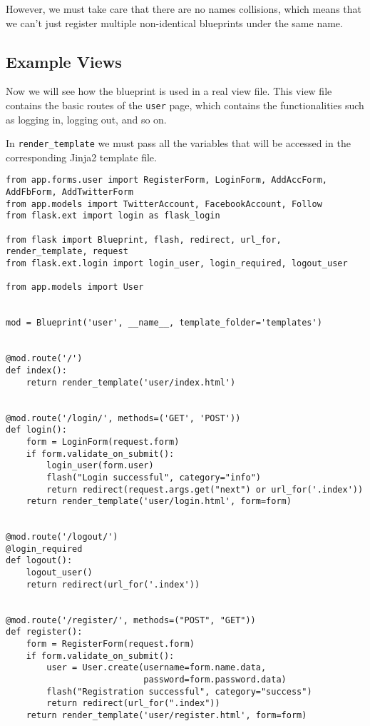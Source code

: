 \documentclass[../main/main.tex]{subfiles}
\begin{document}
However, we must take care that there are no names collisions, which
means that we can't just register multiple non-identical blueprints
under the same name. 

\subsection{Example Views}

Now we will see how the blueprint is used in a real view file. This view file
contains the basic routes of the \lstinline|user| page, which contains the
functionalities such as logging in, logging out, and so on.

In \lstinline|render_template| we must pass all the variables that will be
accessed in the corresponding Jinja2 template file. 

\begin{lstlisting}[caption=app/views/user.py, label=lst:data.py]
from app.forms.user import RegisterForm, LoginForm, AddAccForm, AddFbForm, AddTwitterForm
from app.models import TwitterAccount, FacebookAccount, Follow
from flask.ext import login as flask_login

from flask import Blueprint, flash, redirect, url_for, render_template, request
from flask.ext.login import login_user, login_required, logout_user

from app.models import User


mod = Blueprint('user', __name__, template_folder='templates')


@mod.route('/')
def index():
    return render_template('user/index.html')


@mod.route('/login/', methods=('GET', 'POST'))
def login():
    form = LoginForm(request.form)
    if form.validate_on_submit():
        login_user(form.user)
        flash("Login successful", category="info")
        return redirect(request.args.get("next") or url_for('.index'))
    return render_template('user/login.html', form=form)


@mod.route('/logout/')
@login_required
def logout():
    logout_user()
    return redirect(url_for('.index'))


@mod.route('/register/', methods=("POST", "GET"))
def register():
    form = RegisterForm(request.form)
    if form.validate_on_submit():
        user = User.create(username=form.name.data,
                           password=form.password.data)
        flash("Registration successful", category="success")
        return redirect(url_for(".index"))
    return render_template('user/register.html', form=form)
\end{lstlisting}
\end{document}
